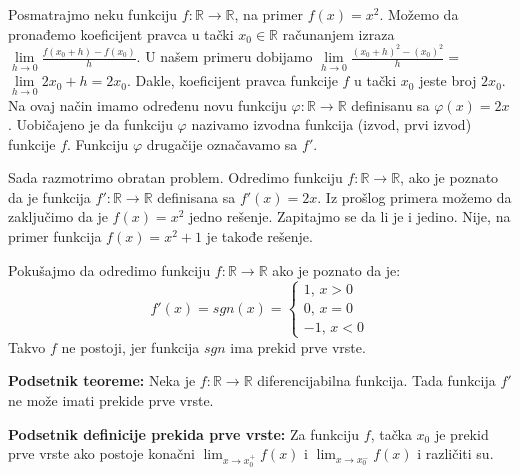 \documentclass{article}
\begin{document}
Posmatrajmo neku funkciju $f: \mathbb{R} \longrightarrow \mathbb{R}$, na primer
$f(x) = x^2$. Možemo da pronađemo koeficijent pravca u tački
$x_0 \in \mathbb{R}$ računanjem izraza $\lim\limits_{h \to 0} \frac{f(x_0+h) - f(x_0)}{h}$.
U našem primeru dobijamo
$\lim\limits_{h \to 0} \frac{(x_0+h)^2 - (x_0)^2}{h} = $
$\lim\limits_{h \to 0} 2 x_0 + h = 2 x_0$.
Dakle, koeficijent pravca funkcije $f$ u tački $x_0$ jeste broj $2 x_0$.
Na ovaj način imamo određenu novu funkciju
$\varphi : \mathbb{R} \longrightarrow \mathbb{R}$ definisanu
sa $\varphi(x) = 2 x$. Uobičajeno je da funkciju $\varphi$ nazivamo
izvodna funkcija (izvod, prvi izvod) funkcije $f$.
Funkciju $\varphi$ drugačije označavamo sa $f'$.\par
Sada razmotrimo obratan problem. Odredimo funkciju $f: \mathbb{R} \longrightarrow \mathbb{R}$,
ako je poznato da je funkcija
$f': \mathbb{R} \longrightarrow \mathbb{R}$ definisana sa
$f'(x) = 2 x$. Iz prošlog primera možemo da zaključimo da je $f(x) = x^2$ jedno rešenje. Zapitajmo
se da li je i jedino. Nije, na primer funkcija $f(x) = x^2 + 1$
je takođe rešenje.\par
Pokušajmo da odredimo funkciju $f: \mathbb{R} \longrightarrow \mathbb{R}$ ako je
poznato da je:
$$
    f'(x) = sgn(x)=
    \begin{cases}
        1\text{, }x > 0 \\
        0\text{, }x = 0 \\
        -1\text{, }x < 0
    \end{cases}
$$
Takvo $f$ ne postoji, jer funkcija $sgn$ ima prekid prve vrste.

\begin{teoremabox}
    \textbf{Podsetnik teoreme:} Neka je $f: \mathbb{R}\longrightarrow\mathbb{R}$ diferencijabilna funkcija.
    Tada funkcija $f'$ ne može imati prekide prve vrste.
\end{teoremabox}
\begin{defbox}
    \textbf{Podsetnik definicije prekida prve vrste:} Za funkciju $f$,
    tačka $x_0$ je prekid prve vrste ako postoje konačni $\lim_{x\rightarrow x_0^+}f(x)$
    i $\lim_{x\rightarrow x_0^-}f(x)$ i različiti su.
\end{defbox}
\end{document}
